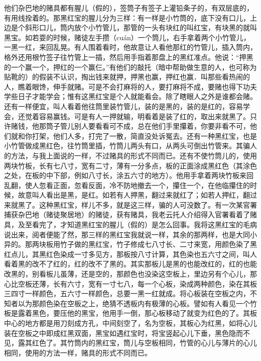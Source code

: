 \documentclass[12pt,UTF8]{ctexbook}
\begin{document}
他们杂巴地的赌具都有腥儿（假的），签筒子有签子上灌铅条子的，有双层底的，有用线拴着的。那黑红宝的腥儿分为三样：有一样是小竹筒的，底下没有口儿，上边是个斜形口儿，筒内放个小竹管儿，那管的一头有块红的叫红宝，有块黑的就叫黑宝。如若耍的时候，赌徒左手攒（cuán）一个筒儿，右手拿着两个小竹管儿，一黑一红，来回乱晃。有人围着看时，他故意让人看他那红的竹管儿，插入筒内，格外还用根竹签子往竹管上一插，然后用手指着那盘上的黑红准点。他说：“押黑的一个赢一个，押红的一个赢仨。”有他们的敲托（暗中帮助做生意的人，也可称为贴靴的）的假装不认识，掏出钱来就押，押黑也赢，押红也赢．叫那些看热闹的人，瞧着眼馋，伸手就赌。可是不会打麻将的人，要打麻将不成，要赌也得下功夫学些日子才能学会；惟有这黑红宝是个人就能看会。除了瞎眼人之外是谁都会赌。还有一样便宜，叫人看着他往筒里装竹管儿，装的是黑的，装的是红的，容易学会，还觉着容易赢钱。可是有人一押就输，明看着是装了红的，取出来就黑了。只许赌钱，他那筒子管儿别人要看看可不成，总在他们手里攥着，你要非看不可，他们就和你打架，他们人多，打完了一散，简直没处诉冤去。还有一种黑红宝，也是小竹管做成黑红色，往竹筒里插，竹筒儿两头有口，从两头可倒出竹管来。其骗人的方法，与我上面说的一样，不过赌具的形式不同而已。还有不使竹筒儿的，使用两块竹板，长有七八寸，宽有二寸，薄有一分多点，板的正面涂成黑红色（其涂色之处，在板的中下部，例如八寸长，涂五六寸的地方）。他用手拿着两块竹板来回乱翻，使人忽看正面，忽看反面，冷不防地撤去一个，攥住一个，在他临攥住的时候，故意叫人看出是黑，是红。如若有人押黑，翻过来就红了；如若人押红，翻过来就黑了。这种黑红宝，样儿不多，就是这三样，骗的人可没数了。有一次某官署捕获杂巴地（赌徒聚居地）的赌徒，获有赌具，我老云托人介绍得入官署看着了赌具，及至看完了，才知道黑红宝的腥儿（假的）是怎么回事。我将这黑红宝的毛病说出来，阅者便能了然，那三样的黑红宝我就说一样，其余的那两样，也是大同小异的。那两块板用竹子做的黑红宝，竹子修成七八寸长、二寸来宽，用颜色染了黑红点儿，其黑红色染成一寸多见方，那板按八寸计算，其色染也五六寸之间，叫人看着黑的改不了红的，红的改不了黑的。其实那板儿是黑的也能改红的，红的也能改黑的，别看板儿虽薄，还是空的，那颜色也没染这空板上，里边另有个心儿，那心比空板还薄，长有六寸，宽有一寸七八，每一个心板，染成两种颜色，染在其板三四寸一样颜色，五六寸一样颜色，总要一黑一红就成。将心板装在空板之内，不知者以为那颜色染在空板之上，绝猜不透板内有极薄的心板。譬如有人看见一个竹板是露着黑色，要压他的黑宝，他用手一倒，那心板移动了就变为红色的了。其板中心的地方都是用刀刻成方孔，中间刻空了，名为空板，其板心为红黑，如将心儿装在空板之中即成红黑双面，黑宝如遇红宝时，将宝竖起心儿下垂，黑色隐而不见，露其红色了。其竹筒内的黑红宝，筒儿与空板相同，竹管的心儿与薄片的心儿相同，使用的方法一样，赌具的形式不同而已。
\end{document}
